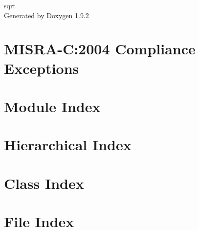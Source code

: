 \documentclass[twoside]{book}
\newcommand{\+}{\discretionary{\mbox{\scriptsize$\hookleftarrow$}}{}{}}
\newcommand{\clearemptydoublepage}{%
    \newpage{\pagestyle{empty}\cleardoublepage}%
  }
\begin{document}
  \raggedbottom
    \hypersetup{pageanchor=false,
                bookmarksnumbered=true,
                pdfencoding=unicode
               }
  \begin{titlepage}
  \vspace*{7cm}
  \begin{center}%
  {\Large sqrt}\\
  \vspace*{1cm}
  {\large Generated by Doxygen 1.9.2}\\
  \end{center}
  \end{titlepage}
  \clearemptydoublepage
  \tableofcontents
  \clearemptydoublepage
  \hypersetup{pageanchor=true}
\chapter{MISRA-\/C\+:2004 Compliance Exceptions}
\label{_c_m_s_i_s__m_i_s_r_a__exceptions}

\chapter{Module Index}

\chapter{Hierarchical Index}

\chapter{Class Index}

\chapter{File Index}

\end{document}
